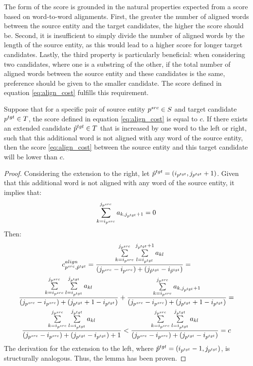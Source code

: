 The form of the score is grounded in the natural properties expected from a score
based on word-to-word alignments. First, the greater the number of aligned words
between the source entity and the target candidates, the higher the score should be.
Second, it is insufficient to simply divide the number of aligned words by the length
of the source entity, as this would lead to a higher score for longer target candidates.
Lastly, the third property is particularly beneficial: when considering two candidates,
where one is a substring of the other, if the total number of aligned words between the
source entity and these candidates is the same, preference should be given to the
smaller candidate. The score defined in equation \eqref{eq:align_cost} fulfills this
requirement.
\begin{lemma} \label{lemma:align_cost_decrease}
  Suppose that for a specific pair of source entity \( p^{src} \in S \) and
  target candidate \( p^{tgt} \in T \), the score defined in equation
  \eqref{eq:align_cost} is equal to \( c \). If there exists an extended
  candidate \( \hat{p}^{tgt} \in T \) that is increased by one word to the
  left or right, such that this additional word is not aligned with any word
  of the source entity, then the score \eqref{eq:align_cost} between the source
  entity and this target candidate will be lower than \( c \).
\end{lemma}
\begin{proof}
  Considering the extension to the right, let \( \hat{p}^{tgt} = (i_{p^{tgt}}, j_{p^{tgt}} + 1) \).
  Given that this additional word is not aligned with any word of the source entity,
  it implies that:
  \[
    \sum\limits_{k=i_{p^{src}}}^{j_{p^{src}}} a_{k,j_{p^{tgt}} + 1} = 0
  \]
  Then:
  \begin{multline*}
    c_{p^{src}, \hat{p}^{tgt}}^{align} =
    \frac{\sum\limits_{k=i_{p^{src}}}^{j_{p^{src}}} \sum\limits_{l=i_{p^{tgt}}}^{j_{p^{tgt}} + 1} a_{kl}}
    {(j_{p^{src}} - i_{p^{src}}) + (j_{\hat{p}^{tgt}} - i_{\hat{p}^{tgt}})} =                                \\
    \frac{\sum\limits_{k=i_{p^{src}}}^{j_{p^{src}}} \sum\limits_{l=i_{p^{tgt}}}^{j_{p^{tgt}}} a_{kl}}
    {(j_{p^{src}} - i_{p^{src}}) + (j_{p^{tgt}} + 1 - i_{p^{tgt}})} +
    \frac{\sum\limits_{k=i_{p^{src}}}^{j_{p^{src}}} a_{k,j_{p^{tgt}} + 1}}
    {(j_{p^{src}} - i_{p^{src}}) + (j_{p^{tgt}} + 1 - i_{p^{tgt}})} =                                        \\
    \frac{\sum\limits_{k=i_{p^{src}}}^{j_{p^{src}}} \sum\limits_{l=i_{p^{tgt}}}^{j_{p^{tgt}}} a_{kl}}
    {(j_{p^{src}} - i_{p^{src}}) + (j_{p^{tgt}} - i_{p^{tgt}}) + 1} <
    \frac{\sum\limits_{k=i_{p^{src}}}^{j_{p^{src}}} \sum\limits_{l=i_{p^{tgt}}}^{j_{p^{tgt}}} a_{kl}}
    {(j_{p^{src}} - i_{p^{src}}) + (j_{p^{tgt}} - i_{p^{tgt}})} = c
  \end{multline*}
  The derivation for the extension to the left, where
  \( \hat{p}^{tgt} = (i_{p^{tgt}} - 1, j_{p^{tgt}}) \), is structurally analogous.
  Thus, the lemma has been proven.
\end{proof}

